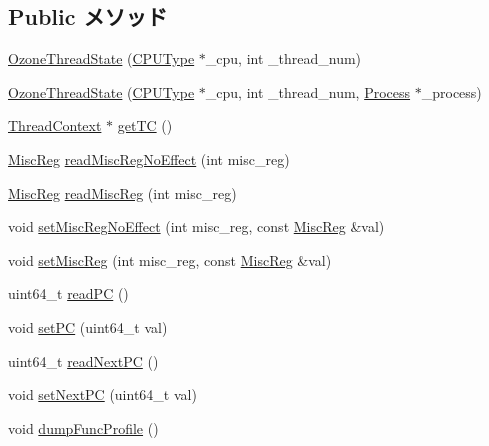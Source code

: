 \subsection*{Public メソッド}
\begin{DoxyCompactItemize}
\item 
\hyperlink{structOzoneThreadState_a8c1ba550756f8d9217041ba9ed9e04a3}{OzoneThreadState} (\hyperlink{structOzoneThreadState_ad0cc927c8534eaba1d99c29b2942311f}{CPUType} $\ast$\_\-cpu, int \_\-thread\_\-num)
\item 
\hyperlink{structOzoneThreadState_a2668b8773d0255979b399ca156875040}{OzoneThreadState} (\hyperlink{structOzoneThreadState_ad0cc927c8534eaba1d99c29b2942311f}{CPUType} $\ast$\_\-cpu, int \_\-thread\_\-num, \hyperlink{classProcess}{Process} $\ast$\_\-process)
\item 
\hyperlink{classThreadContext}{ThreadContext} $\ast$ \hyperlink{structOzoneThreadState_a81894d15db5190d5364449a4915b76f5}{getTC} ()
\item 
\hyperlink{structOzoneThreadState_aaf5f073a387db0556d1db4bcc45428bc}{MiscReg} \hyperlink{structOzoneThreadState_a7b5ac6af9c2c19d7c1b442b8a3aebbc6}{readMiscRegNoEffect} (int misc\_\-reg)
\item 
\hyperlink{structOzoneThreadState_aaf5f073a387db0556d1db4bcc45428bc}{MiscReg} \hyperlink{structOzoneThreadState_a5a8c6c487e8da143d26188258b04f1cc}{readMiscReg} (int misc\_\-reg)
\item 
void \hyperlink{structOzoneThreadState_a763517aaea2f3decbc1ef9d064216b6f}{setMiscRegNoEffect} (int misc\_\-reg, const \hyperlink{structOzoneThreadState_aaf5f073a387db0556d1db4bcc45428bc}{MiscReg} \&val)
\item 
void \hyperlink{structOzoneThreadState_a1877dde4f3eb17a8b7d33ea40176c148}{setMiscReg} (int misc\_\-reg, const \hyperlink{structOzoneThreadState_aaf5f073a387db0556d1db4bcc45428bc}{MiscReg} \&val)
\item 
uint64\_\-t \hyperlink{structOzoneThreadState_a30cb2afdfdc1383b7804c167dcf5ee78}{readPC} ()
\item 
void \hyperlink{structOzoneThreadState_a27cf930ee8c23222a063cdc302aa0efb}{setPC} (uint64\_\-t val)
\item 
uint64\_\-t \hyperlink{structOzoneThreadState_acac7689eb460c7ab0e23797c198b7028}{readNextPC} ()
\item 
void \hyperlink{structOzoneThreadState_ac01bbbec5b2a7338e18d05322ba78cd3}{setNextPC} (uint64\_\-t val)
\item 
void \hyperlink{structOzoneThreadState_a13fa12d1779a94a1e0b968946a1367c7}{dumpFuncProfile} ()
\end{DoxyCompactItemize}
